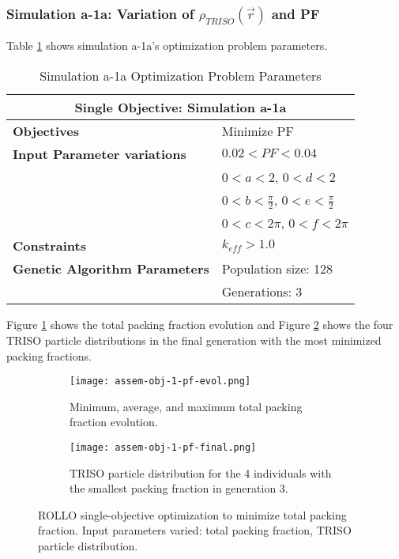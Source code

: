 \subsubsection{Simulation a-1a: Variation of $\rho_{TRISO}(\vec{r})$ and PF}
Table \ref{tab:simulationa1a} shows simulation a-1a's optimization problem parameters. 
\begin{table}[htbp]
    \centering
    \onehalfspacing
    \caption{Simulation a-1a Optimization Problem Parameters}
	\label{tab:simulationa1a}
    \footnotesize
    \begin{tabular}{l|p{3cm}}
    \hline 
    \multicolumn{2}{c}{\textbf{Single Objective: Simulation a-1a}} \\
    \hline 
    \textbf{Objectives} & Minimize PF \\
    \hline 
    \textbf{Input Parameter variations} & $0.02<PF<0.04$ \\
    & $0<a<2$, $0<d<2$\\
    & $0<b<\frac{\pi}{2}$, $0<e<\frac{\pi}{2}$\\
    & $0<c<2\pi$, $0<f<2\pi$\\
    \hline
    \textbf{Constraints} & $k_{eff} > 1.0$\\ 
    \hline 
    \textbf{Genetic Algorithm Parameters} & Population size: 128 \\
    & Generations: 3 \\
    \hline
    \end{tabular}
\end{table}
Figure \ref{fig:assem-obj-1-pf-evol} shows the total packing fraction evolution and 
Figure \ref{fig:assem-obj-1-pf-final} shows the four TRISO particle distributions in 
the final generation with the most minimized packing fractions. 
\begin{figure}[htbp]
    \centering
    \begin{subfigure}{\textwidth}
        \texttt{[image: assem-obj-1-pf-evol.png]}
        \caption{Minimum, average, and maximum total packing fraction evolution.}
        \label{fig:assem-obj-1-pf-evol} 
    \end{subfigure}
    \begin{subfigure}{\textwidth}
        \texttt{[image: assem-obj-1-pf-final.png]}
        \caption{TRISO particle distribution for the 4 individuals with the 
        smallest packing fraction in generation 3.}
        \label{fig:assem-obj-1-pf-final} 
    \end{subfigure}
    \caption{ROLLO single-objective optimization to minimize total packing fraction. 
    Input parameters varied: total packing fraction, TRISO particle distribution.}
    \label{fig:assem-obj-1-pf}
\end{figure}
